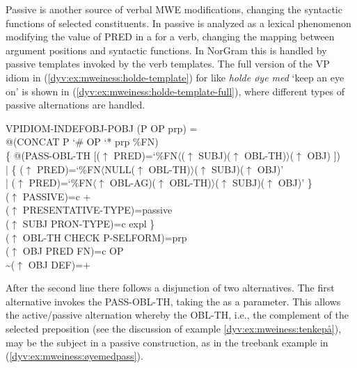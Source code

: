 \documentclass[output=paper]{langsci/langscibook}
\begin{document}
Passive is another source of verbal MWE modifications, changing the syntactic functions of selected constituents.
In  passive is analyzed as a lexical phenomenon modifying the value of PRED in a  for a verb, changing the mapping between argument positions and syntactic functions.
In NorGram this is handled by passive templates invoked by the verb templates.
The full version of the VP idiom  in (\ref{dyv:ex:mweiness:holde-template}) for  like \textit{holde øye med} `keep an eye on' is shown in (\ref{dyv:ex:mweiness:holde-template-full}), where different types of passive alternations are handled.


\ea\label{dyv:ex:mweiness:holde-template-full}
{\small 
 VPIDIOM-INDEFOBJ-POBJ (P OP prp) =\\%
\hspace{1.5em} @(CONCAT P `\# OP `* prp \%FN)\\%
\hspace{1.5em}  \{ \enspace @(PASS-OBL-TH [($\uparrow$  PRED)=`\%FN$\langle$($\uparrow$ SUBJ)($\uparrow$ OBL-TH)$\rangle$($\uparrow$ OBJ) ])\\%
\hspace{1.5em} | \enspace \{ \enspace ($\uparrow$  PRED)=`\%FN$\langle$NULL($\uparrow$ OBL-TH)$\rangle$($\uparrow$ SUBJ)($\uparrow$ OBJ)'\\%
\hspace{1.5em} \quad | \enspace ($\uparrow$  PRED)=`\%FN$\langle$$\uparrow$ OBL-AG)($\uparrow$  OBL-TH)$\rangle$($\uparrow$ SUBJ)($\uparrow$ OBJ)' \enspace \}\\%
\hspace{1.5em} \quad ($\uparrow$ PASSIVE)=c +\\%
\hspace{1.5em} \quad ($\uparrow$ PRESENTATIVE-TYPE)=passive\\%
\hspace{1.5em} \quad ($\uparrow$ SUBJ PRON-TYPE)=c expl \enspace \}\\%
\hspace{1.5em} ($\uparrow$ OBL-TH CHECK P-SELFORM)=prp\\%
\hspace{1.5em} ($\uparrow$ OBJ PRED FN)=c OP\\%
\hspace{1.5em} {\textasciitilde}($\uparrow$ OBJ DEF)=+
}
\z

After the second line there follows a disjunction of two alternatives.
The first alternative invokes the  PASS-OBL-TH, taking the  as a parameter.
This  allows the active/passive alternation whereby the OBL-TH, i.e., the complement of the selected preposition (see the discussion of example \ref{dyv:ex:mweiness:tenkepå}), may be the subject in a passive construction, as in the treebank example in (\ref{dyv:ex:mweiness:øyemedpass}).
\end{document}
